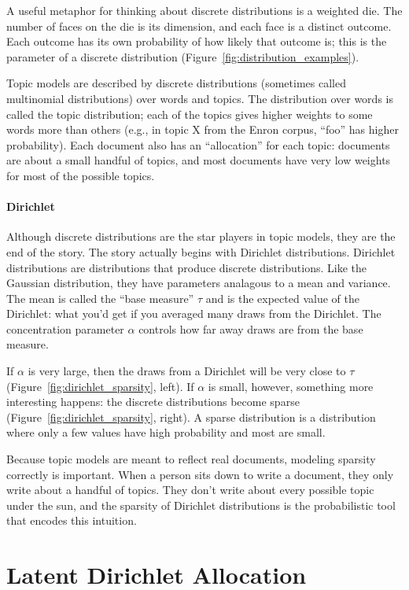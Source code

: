 A useful metaphor for thinking about discrete distributions is a weighted die.
The number of faces on the die is its dimension, and each face is a distinct
outcome.  Each outcome has its own probability of how likely that outcome is;
this is the parameter of a discrete distribution
(Figure~\ref{fig:distribution_examples}).

Topic models are described by discrete distributions (sometimes called
multinomial distributions) over words and topics.  The distribution over words
is called the topic distribution; each of the topics gives higher weights to
some words more than others (e.g., in topic X from the Enron corpus, ``foo'' has
higher probability).  Each document also has an ``allocation'' for each topic:
documents are about a small handful of topics, and most documents have very low
weights for most of the possible topics.

\paragraph{Dirichlet}

Although discrete distributions are the star players in topic models, they are
the end of the story.  The story actually begins with Dirichlet distributions.
Dirichlet distributions are distributions that produce discrete distributions.
Like the Gaussian distribution, they have parameters analagous to a mean and
variance.  The mean is called the ``base measure'' $\tau$ and is the expected
value of the Dirichlet: what you'd get if you averaged many draws from the
Dirichlet.  The concentration parameter $\alpha$ controls how far away draws are
from the base measure.

If $\alpha$ is very large, then the draws from a Dirichlet will be very close to
$\tau$ (Figure~\ref{fig:dirichlet_sparsity}, left).  If $\alpha$ is small, however,
something more interesting happens: the discrete distributions become sparse
(Figure~\ref{fig:dirichlet_sparsity}, right).  A sparse distribution is a
distribution where only a few values have high probability and most are small.

Because topic models are meant to reflect real documents, modeling sparsity
correctly is important.  When a person sits down to write a document, they only
write about a handful of topics.  They don't write about every possible topic
under the sun, and the sparsity of Dirichlet distributions is the probabilistic
tool that encodes this intuition.

\section{Latent Dirichlet Allocation}

